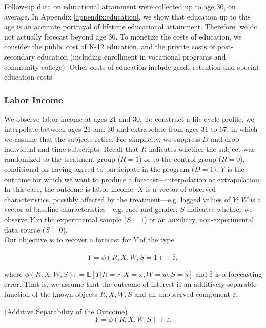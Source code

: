 Follow-up data on educational attainment were collected up to age 30, on average. In Appendix \ref{appendix:education}, we show that education up to this age is an accurate portrayal of lifetime educational attainment. Therefore, we do not actually forecast beyond age 30. To monetize the costs of education, we consider the public cost of K-12 education, and the private costs of post-secondary education (including enrollment in vocational programs and community college). Other costs of education include grade retention and special education costs. 

\subsubsection{Labor Income}

\noindent We observe labor income at ages 21 and 30. To construct a life-cycle profile, we interpolate between ages 21 and 30 and extrapolate from ages 31 to 67, in which we assume that the subjects retire. For simplicity, we suppress $D$ and drop individual and time subscripts. Recall that $R$ indicates whether the subject was randomized to the treatment group ($R=1$) or to the control group ($R=0$), conditional on having agreed to participate in the program ($D = 1$). $Y$ is the outcome for which we want to produce a forecast---interpolation or extrapolation. In this case, the outcome is labor income. $X$ is a vector of observed characteristics, possibly affected by the treatment---e.g. lagged values of $Y$; $W$ is a vector of baseline characteristics---e.g. race and gender; $S$ indicates whether we observe $Y$ in the experimental sample ($S=1$) or an auxiliary, non-experimental data source ($S=0$).\\

\noindent Our objective is to recover a forecast for $Y$ of the type

\begin{equation}
\widehat{Y} = \widehat{\phi} \left( R, X, W, S = 1 \right) + \widehat{\varepsilon},   \label{eq:additive}
\end{equation}

\noindent where $\phi \left( R, X, W, S \right) : = \mathbb{E} \left[ Y | R = r, X = x, W = w, S = s \right] $ and $\widehat{\varepsilon}$ is a forecasting error. That is, we assume that the outcome of interest is an additively separable function of the known objects $R, X, W, S$ and an unobserved component $\varepsilon$: 

\begin{assumption} (Additive Separability of the Outcome) \label{ass:additive}
\begin{equation}
Y = \phi \left( R, X, W, S \right) + \varepsilon. 
\end{equation}
\end{assumption}

